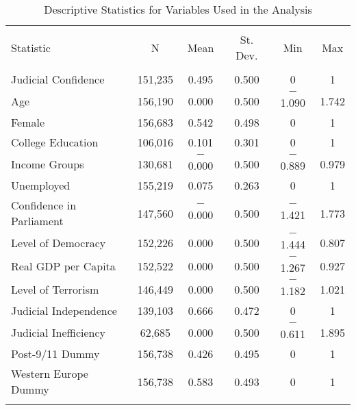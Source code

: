 \documentclass[11pt,]{article}
\begin{document}
\begin{table}[!htbp] \centering 
  \caption{Descriptive Statistics for Variables Used in the Analysis} 
  \label{tab:descript} 
\begin{tabular}{@{\extracolsep{5pt}}lccccc} 
\\[-1.8ex]\hline 
\hline \\[-1.8ex] 
Statistic & \multicolumn{1}{c}{N} & \multicolumn{1}{c}{Mean} & \multicolumn{1}{c}{St. Dev.} & \multicolumn{1}{c}{Min} & \multicolumn{1}{c}{Max} \\ 
\hline \\[-1.8ex] 
Judicial Confidence & 151,235 & 0.495 & 0.500 & 0 & 1 \\ 
Age & 156,190 & 0.000 & 0.500 & $-$1.090 & 1.742 \\ 
Female & 156,683 & 0.542 & 0.498 & 0 & 1 \\ 
College Education & 106,016 & 0.101 & 0.301 & 0 & 1 \\ 
Income Groups & 130,681 & $-$0.000 & 0.500 & $-$0.889 & 0.979 \\ 
Unemployed & 155,219 & 0.075 & 0.263 & 0 & 1 \\ 
Confidence in Parliament & 147,560 & $-$0.000 & 0.500 & $-$1.421 & 1.773 \\ 
Level of Democracy & 152,226 & 0.000 & 0.500 & $-$1.444 & 0.807 \\ 
Real GDP per Capita & 152,522 & 0.000 & 0.500 & $-$1.267 & 0.927 \\ 
Level of Terrorism & 146,449 & 0.000 & 0.500 & $-$1.182 & 1.021 \\ 
Judicial Independence & 139,103 & 0.666 & 0.472 & 0 & 1 \\ 
Judicial Inefficiency & 62,685 & 0.000 & 0.500 & $-$0.611 & 1.895 \\ 
Post-9/11 Dummy & 156,738 & 0.426 & 0.495 & 0 & 1 \\ 
Western Europe Dummy & 156,738 & 0.583 & 0.493 & 0 & 1 \\ 
\hline \\[-1.8ex] 
\end{tabular} 
\end{table}
\end{document}
